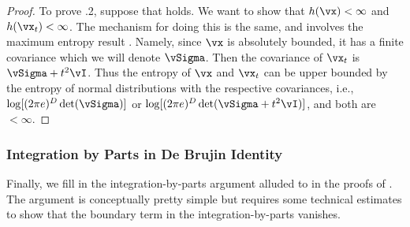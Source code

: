 \documentclass[../../book-main.tex]{subfiles}
\begin{document}
\begin{proof}
    To prove .2, suppose that  holds. We want to show that \(h(\vx) < \infty\) and \(h(\vx_{t}) < \infty\). The mechanism for doing this is the same, and involves the maximum entropy result . Namely, since \(\vx\) is absolutely bounded, it has a finite covariance which we will denote \(\vSigma\). Then the covariance of \(\vx_{t}\) is \(\vSigma + t^{2}\vI\). Thus the entropy of \(\vx\) and \(\vx_{t}\) can be upper bounded by the entropy of normal distributions with the respective covariances, i.e., \(\log[(2\pi e)^{D}\det(\vSigma)]\) or \(\log[(2\pi e)^{D}\det(\vSigma + t^{2}\vI)]\), and both are \(< \infty\).
\end{proof}

\subsubsection{Integration by Parts in De Brujin Identity}

Finally, we fill in the integration-by-parts argument alluded to in the proofs of . The argument is conceptually pretty simple but requires some technical estimates to show that the boundary term in the integration-by-parts vanishes.
\end{document}
